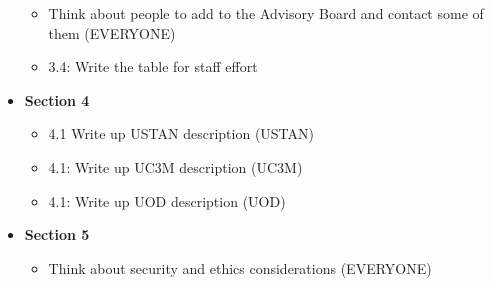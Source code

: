 \documentclass[a4paper,11pt]{article}
\begin{document}
\begin{itemize}
\begin{itemize}
\item Think about people to add to the Advisory Board and contact some of them (EVERYONE)

\item 3.4: Write the table for staff effort

\end{itemize}

\item \textbf{Section 4}
\begin{itemize}

\item 4.1 Write up USTAN description (USTAN)

\item 4.1: Write up UC3M description (UC3M)

\item 4.1: Write up UOD description (UOD)
\end{itemize}

\item \textbf{Section 5}
\begin{itemize}
\item Think about security and ethics considerations (EVERYONE)
\end{itemize}
\end{itemize}
\end{document}
